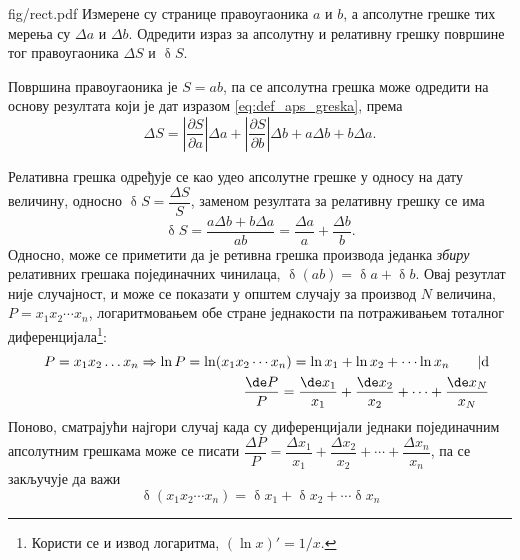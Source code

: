 \begin{slikaDesno}{fig/rect.pdf}
\PID \label{z:proizvod}
Измерене су странице правоугаоника $a$ и $b$, а апсолутне грешке тих мерења су 
$\Delta a$ и $\Delta b$. Одредити израз за апсолутну и релативну грешку површине 
тог правоугаоника $\Delta S$ и $\updelta S$.
\end{slikaDesno}

\RESENJE

Површина правоугаоника је $S = ab$, па се апсолутна грешка може одредити на 
основу резултата који је дат изразом \eqref{eq:def_aps_greska}, према 
\begin{equation}
    \Delta S = 
    \left| \dfrac{\partial S}{\partial a} \right| \Delta a + 
    \left| \dfrac{\partial S}{\partial b} \right| \Delta b + 
    a \Delta b + b \Delta a.
\end{equation} 

Релативна грешка одређује се као удео апсолутне грешке у односу на дату величину, односно 
$\updelta S = \dfrac{\Delta S}{S}$, заменом резултата за релативну грешку се има 
\begin{equation}
    \updelta S = \dfrac{a \Delta b + b \Delta a}{ab} 
    = \dfrac{\Delta a}{a} + \dfrac{\Delta b}{b}.
\end{equation}
Односно, може се приметити да је ретивна грешка производа једанка \textit{збиру} релативних грешака 
појединачних чинилаца, $\updelta(ab) = \updelta a + \updelta b$. Овај резутлат није случајност, и може се 
показати у општем случају за производ $N$ величина, $P = x_1 x_2 \cdots x_n$, логаритмовањем обе стране једнакости 
па потраживањем тоталног диференцијала\footnote{Користи се и извод логаритма, $(\ln x)' = 1/x$.}:
\begin{eqnarray}
    &&
    P = x_1 x_2 \ldots x_n \Rightarrow
    \ln P = \ln(x_1 x_2 \cdots x_n) = \ln x_1 + \ln x_2 + \cdots \ln x_n \qquad | \rm d
    \\
    && 
    \dfrac{\de P}{P} = \dfrac{\de x_1}{x_1} + \dfrac{\de x_2}{x_2} + \cdots + \dfrac{\de x_N}{x_N}
\end{eqnarray} 
Поново, сматрајући најгори случај када су диференцијали једнаки појединачним апсолутним грешкама може се 
писати 
$\dfrac{\Delta P}{P} = \dfrac{\Delta x_1}{x_1} + \dfrac{\Delta x_2}{x_2} + \cdots + \dfrac{\Delta x_n}{x_n}$, 
па се закључује да важи 
\begin{equation}
    \updelta(x_1 x_2 \cdots x_n) 
    = \updelta x_1 + 
    \updelta x_2 + 
    \cdots 
    \updelta x_n
\end{equation}